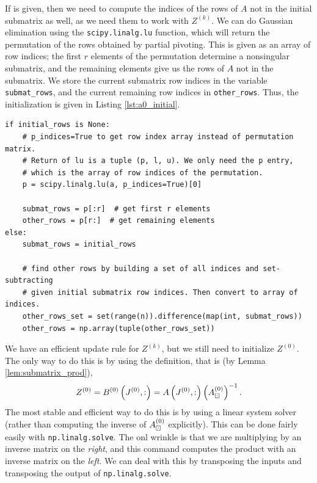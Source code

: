 \documentclass{article}
\begin{document}
	If \vinitialrows{} is given, then we need to compute the indices of the rows of $A$ not in the initial submatrix as well, as we need them to work with $Z^{(k)}$. We can do Gaussian elimination using the \texttt{scipy.linalg.lu} function, which will return the permutation of the rows obtained by partial pivoting. This is given as an array of row indices; the first $r$ elements of the permutation determine a nonsingular submatrix, and the remaining elements give us the rows of $A$ not in the submatrix. We store the current submatrix row indices in the variable \texttt{submat\_rows}, and the current remaining row indices in \texttt{other\_rows}. Thus, the initialization is given in Listing \ref{lst:a0_initial}.
	\begin{lstlisting}[caption={$\matstep{0}$ initialization}, label=lst:a0_initial]
if initial_rows is None:
    # p_indices=True to get row index array instead of permutation matrix.
    # Return of lu is a tuple (p, l, u). We only need the p entry, 
    # which is the array of row indices of the permutation.
    p = scipy.linalg.lu(a, p_indices=True)[0]
    
    submat_rows = p[:r]  # get first r elements
    other_rows = p[r:]  # get remaining elements
else:
    submat_rows = initial_rows
    
    # find other rows by building a set of all indices and set-subtracting
    # given initial submatrix row indices. Then convert to array of indices.
    other_rows_set = set(range(n)).difference(map(int, submat_rows))
    other_rows = np.array(tuple(other_rows_set))
	\end{lstlisting}
	
	
	\newcommand{\vz}{\texttt{z}}
	
	We have an efficient update rule for $Z^{(k)}$, but we still need to initialize $Z^{(0)}$. The only way to do this is by using the definition, that is (by Lemma \ref{lem:submatrix_prod}),
	\begin{equation}
		Z^{(0)} = B^{(0)}\left(J^{(0)}, :\right) = A\left(J^{(0)}, :\right)\left(A_\boxdot^{(0)}\right)^{-1}.
	\end{equation}
	The most stable and efficient way to do this is by using a linear system solver (rather than computing the inverse of $A_\boxdot^{(0)}$ explicitly). This can be done fairly easily with \texttt{np.linalg.solve}. The onl wrinkle is that we are multiplying by an inverse matrix on the \textit{right}, and this command computes the product with an inverse matrix on the \textit{left}. We can deal with this by transposing the inputs and transposing the output of \texttt{np.linalg.solve}. 
	
\end{document}
